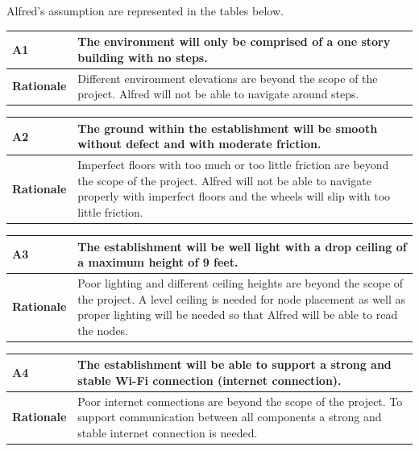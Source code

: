 \documentclass [10pt]{article}
\begin{document}
Alfred's assumption are represented in the tables below.  \\

\begin{longtable}{| p{ } | p{ } | }\hline 
\rowcolor{tableCell}\textbf{A1} & The environment will only be comprised of a one story building with no steps. \\ \hline
\textbf{Rationale} & Different environment elevations are beyond the scope of the project. Alfred will not be able to navigate around steps.\\ \hline 
\end{longtable}

\pagebreak 

\begin{longtable}{| p{ } | p{ } | }\hline 
\rowcolor{tableCell}\textbf{A2} & The ground within the establishment will be smooth without defect and with moderate friction. \\ \hline
\textbf{Rationale} & Imperfect floors with too much or too little friction are beyond the scope of the project. Alfred will not be able to navigate properly with imperfect floors and the wheels will slip with too little friction. \\ \hline 
\end{longtable}

\begin{longtable}{| p{ } | p{ } | }\hline 
\rowcolor{tableCell}\textbf{A3} & The establishment will be well light with a drop ceiling of a maximum height of 9 feet.  \\ \hline
\textbf{Rationale} & Poor lighting and different ceiling heights are beyond the scope of the project. A level ceiling is needed for node placement as  well as proper lighting will be needed so that Alfred will be able to read the nodes. \\ \hline 
\end{longtable}

\begin{longtable}{| p{ } | p{ } | }\hline 
\rowcolor{tableCell}\textbf{A4} & The establishment will be able to support a strong and stable Wi-Fi connection (internet connection).  \\ \hline
\textbf{Rationale} & Poor internet connections are beyond the scope of the project. To support communication between all components a strong and stable internet connection is needed.\\ \hline 
\end{longtable}
\end{document}

